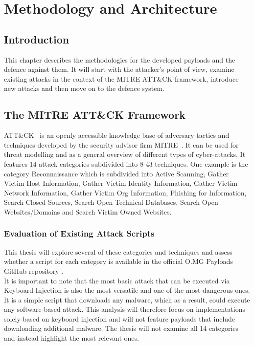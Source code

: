 \chapter{Methodology and Architecture} \label{Methodology}

\section{Introduction}

This chapter describes the methodologies for the developed payloads and the defence against them. It will start with the attacker's point of view, examine existing attacks in the context of the MITRE ATT\&CK framework, introduce new attacks and then move on to the defence system.


\section{The MITRE ATT\&CK Framework}

ATT\&CK~\cite{MITREATTCK} is an openly accessible knowledge base of adversary tactics and techniques developed by the security advisor firm MITRE~\cite{WhoWeAre}. It can be used for threat modelling and as a general overview of different types of cyber-attacks.
It features 14 attack categories subdivided into 8-43 techniques. One example is the category Reconnaissance which is subdivided into Active Scanning, Gather Victim Host Information, Gather Victim Identity Information, Gather Victim Network Information, Gather Victim Org Information, Phishing for Information, Search Closed Sources, Search Open Technical Databases, Search Open Websites/Domains and Search Victim Owned Websites.



\subsection{Evaluation of Existing Attack Scripts}

This thesis will explore several of these categories and techniques and assess whether a script for each category is available in the official O.MG Payloads GitHub repository \cite{Hak5Omgpayloads2024}. \\
It is important to note that the most basic attack that can be executed via Keyboard Injection is also the most versatile and one of the most dangerous ones. It is a simple script that downloads any malware, which as a result, could execute any software-based attack.
This analysis will therefore focus on implementations solely based on keyboard injection and will not feature payloads that include downloading additional malware.
The thesis will not examine all 14 categories and instead highlight the most relevant ones.

